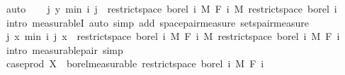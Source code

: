 \begin{isabellebody}
\ auto\isanewline
\ \ \isamarkupfalse%
\ {\isachardoublequoteopen}{\isacharparenleft}{\kern0pt}{\isasymlambda}{\isacharparenleft}{\kern0pt}j{\isacharcomma}{\kern0pt}\ y{\isacharparenright}{\kern0pt}{\isachardot}{\kern0pt}\ min\ i\ j{\isacharparenright}{\kern0pt}\ {\isasymin}\ restrict{\isacharunderscore}{\kern0pt}space\ borel\ {\isacharbraceleft}{\kern0pt}{}{\isachardot}{\kern0pt}{\isachardot}{\kern0pt}i{\isacharbraceright}{\kern0pt}\ {\isasymOtimes}\isactrlsub M\ F\ i\ {\isasymrightarrow}\isactrlsub M\ restrict{\isacharunderscore}{\kern0pt}space\ borel\ {\isacharbraceleft}{\kern0pt}{}{\isachardot}{\kern0pt}{\isachardot}{\kern0pt}i{\isacharbraceright}{\kern0pt}{\isachardoublequoteclose}\ \isamarkupfalse%
\ {\isacharparenleft}{\kern0pt}intro\ measurableI{\isacharparenright}{\kern0pt}\ {\isacharparenleft}{\kern0pt}auto\ simp\ add{\isacharcolon}{\kern0pt}\ space{\isacharunderscore}{\kern0pt}pair{\isacharunderscore}{\kern0pt}measure\ sets{\isacharunderscore}{\kern0pt}pair{\isacharunderscore}{\kern0pt}measure{\isacharparenright}{\kern0pt}\isanewline
\ \ \isamarkupfalse%
\ {\isachardoublequoteopen}{\isacharparenleft}{\kern0pt}{\isasymlambda}{\isacharparenleft}{\kern0pt}j{\isacharcomma}{\kern0pt}\ x{\isacharparenright}{\kern0pt}{\isachardot}{\kern0pt}\ {\isacharparenleft}{\kern0pt}min\ i\ j{\isacharcomma}{\kern0pt}\ x{\isacharparenright}{\kern0pt}{\isacharparenright}{\kern0pt}\ {\isasymin}\ restrict{\isacharunderscore}{\kern0pt}space\ borel\ {\isacharbraceleft}{\kern0pt}{}{\isachardot}{\kern0pt}{\isachardot}{\kern0pt}i{\isacharbraceright}{\kern0pt}\ {\isasymOtimes}\isactrlsub M\ F\ i\ {\isasymrightarrow}\isactrlsub M\ restrict{\isacharunderscore}{\kern0pt}space\ borel\ {\isacharbraceleft}{\kern0pt}{}{\isachardot}{\kern0pt}{\isachardot}{\kern0pt}i{\isacharbraceright}{\kern0pt}\ {\isasymOtimes}\isactrlsub M\ F\ i{\isachardoublequoteclose}\ \isamarkupfalse%
\ {\isacharparenleft}{\kern0pt}intro\ measurable{\isacharunderscore}{\kern0pt}pair{\isacharparenright}{\kern0pt}\ simp{\isacharplus}{\kern0pt}\isanewline
\ \ \isamarkupfalse%
\ \isamarkupfalse%
\ {\isachardoublequoteopen}case{\isacharunderscore}{\kern0pt}prod\ X\ {\isasymin}\ borel{\isacharunderscore}{\kern0pt}measurable\ {\isacharparenleft}{\kern0pt}restrict{\isacharunderscore}{\kern0pt}space\ borel\ {\isacharbraceleft}{\kern0pt}{}{\isachardot}{\kern0pt}{\isachardot}{\kern0pt}i{\isacharbraceright}{\kern0pt}\ {\isasymOtimes}\isactrlsub M\ F\ i{\isacharparenright}{\kern0pt}{\isachardoublequoteclose}\isanewline

\end{isabellebody}
